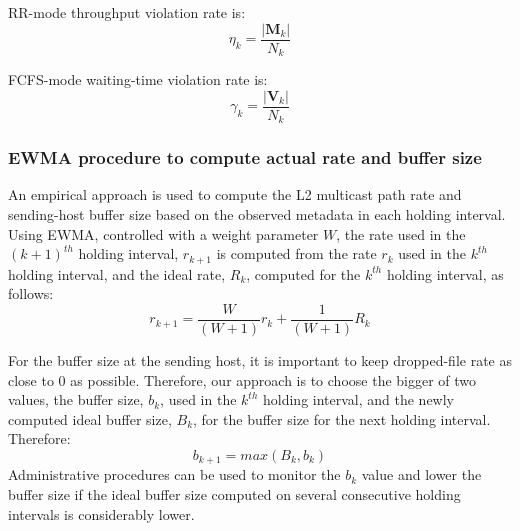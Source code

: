 RR-mode throughput violation rate is:
\begin{equation}
\eta_k = \frac{\left\vert\textbf{M}_k\right\vert}{N_k}
\end{equation}

FCFS-mode waiting-time violation rate is:
\begin{equation}
\gamma_k = \frac{\left\vert\textbf{V}_k\right\vert}{N_k}
\end{equation}

\subsubsection{EWMA procedure to compute actual rate and buffer size}
\label{sec:EWMA}

An empirical approach is used to compute the L2 multicast path
rate and sending-host buffer size based on the observed metadata
in each holding interval.
Using EWMA, controlled with a weight parameter $W$, the rate used
in the $(k+1)^{th}$ holding interval, $r_{k+1}$ is computed from
the rate  $r_{k}$ used in the $k^{th}$ holding interval, and the ideal
rate, $R_k$, computed for the $k^{th}$ holding interval, as follows:
\begin{equation}\label{eqn:EWMA}
r_{k+1} = \frac{W}{(W+1)} r_k + \frac{1}{(W+1)}  R_k
\end{equation}


For the buffer size at the sending host, it is important to
keep dropped-file rate as close to 0 as possible. Therefore,
our approach is to choose the bigger of two values, the buffer
size, $b_k$, used in the $k^{th}$ holding interval, and the newly
computed ideal buffer size, $B_k$, for the buffer size for the next
holding interval. Therefore:
\begin{equation}
b_{k+1} = max(B_k,b_k)
\end{equation}
Administrative procedures can be used to monitor the $b_k$ value
and lower the buffer size if the ideal buffer size computed
on several consecutive holding intervals is considerably lower. 



